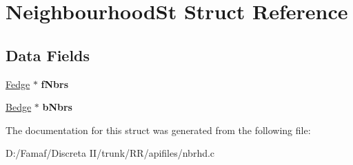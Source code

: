 \hypertarget{struct_neighbourhood_st}{\section{Neighbourhood\+St Struct Reference}
\label{struct_neighbourhood_st}
}
\subsection*{Data Fields}
\begin{DoxyCompactItemize}
\item 
\hypertarget{struct_neighbourhood_st_a2843c2b58881e2ebb07bdb02a891800b}{\hyperlink{struct_fedge_st}{Fedge} $\ast$ {\bfseries f\+Nbrs}}\label{struct_neighbourhood_st_a2843c2b58881e2ebb07bdb02a891800b}

\item 
\hypertarget{struct_neighbourhood_st_a87d0c3ff69186446055ae6d6340a2865}{\hyperlink{struct_bedge_st}{Bedge} $\ast$ {\bfseries b\+Nbrs}}\label{struct_neighbourhood_st_a87d0c3ff69186446055ae6d6340a2865}

\end{DoxyCompactItemize}


The documentation for this struct was generated from the following file\+:\begin{DoxyCompactItemize}
\item 
D\+:/\+Famaf/\+Discreta I\+I/trunk/\+R\+R/apifiles/nbrhd.\+c\end{DoxyCompactItemize}
